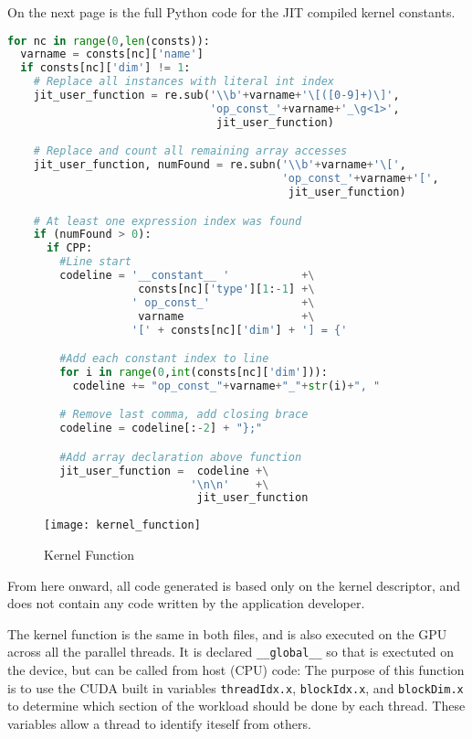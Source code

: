 On the next page is the full Python code for the JIT compiled kernel constants.
\clearpage
\begin{lstlisting}[backgroundcolor = \color{lightgray!20}, language=Python]
for nc in range(0,len(consts)):
  varname = consts[nc]['name']
  if consts[nc]['dim'] != 1:
    # Replace all instances with literal int index
    jit_user_function = re.sub('\\b'+varname+'\[([0-9]+)\]',
                               'op_const_'+varname+'_\g<1>',
                                jit_user_function)

    # Replace and count all remaining array accesses
    jit_user_function, numFound = re.subn('\\b'+varname+'\[',
                                          'op_const_'+varname+'[',
                                           jit_user_function)

    # At least one expression index was found
    if (numFound > 0):
      if CPP:
        #Line start
        codeline = '__constant__ '           +\
                    consts[nc]['type'][1:-1] +\
                   ' op_const_'              +\
                    varname                  +\
                   '[' + consts[nc]['dim'] + '] = {'

        #Add each constant index to line
        for i in range(0,int(consts[nc]['dim'])):
          codeline += "op_const_"+varname+"_"+str(i)+", "

        # Remove last comma, add closing brace
        codeline = codeline[:-2] + "};"

        #Add array declaration above function
        jit_user_function =  codeline +\
                            '\n\n'    +\
                             jit_user_function
\end{lstlisting}
\clearpage
\begin{wrapfigure}[14]{r}{.33\textwidth}
  \centering
  \caption{Kernel Function}
  \label{fig:krnl_func}
  \texttt{[image: kernel\_function]}
\end{wrapfigure}
\minititle{Kernel Function}
From here onward, all code generated is based only on the kernel descriptor, and does not contain any code written by the application developer.
\par The kernel function is the same in both files, and is also executed on the GPU across all the parallel threads. It is declared \verb|__global__| so that is exectuted on the device, but can be called from host (CPU) code:
The purpose of this function is to use the CUDA built in variables \verb|threadIdx.x|, \verb|blockIdx.x|, and \verb|blockDim.x| to determine which section of the workload should be done by each thread. These variables allow a thread to identify iteself from others.


